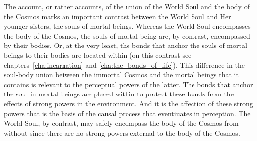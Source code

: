 The account, or rather accounts, of the union of the World Soul and the body of the Cosmos marks an important contrast between the World Soul and Her younger sisters, the souls of mortal beings. Whereas the World Soul encompasses the body of the Cosmos, the souls of mortal being are, by contrast, encompassed by their bodies. Or, at the very least, the bonds that anchor the souls of mortal beings to their bodies are located within (on this contrast see chapters~\ref{cha:incarnation} and \ref{cha:the_bonds_of_life}). This difference in the soul-body union between the immortal Cosmos and the mortal beings that it contains is relevant to the perceptual powers of the latter. The bonds that anchor the soul in mortal beings are placed within to protect these bonds from the effects of strong powers in the environment. And it is the affection of these strong powers that is the basis of the causal process that eventiuates in perception. The World Soul, by contrast, may safely encompass the body of the Cosmos from without since there are no strong powers external to the body of the Cosmos.




